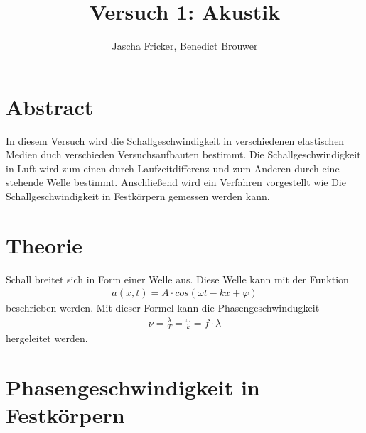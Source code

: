 \documentclass[11pt, a4paper]{article}
\title{Versuch 1: Akustik}
\author{Jascha Fricker, Benedict Brouwer}
\begin{document}
    \maketitle
    

    \section{Abstract}
    In diesem Versuch wird die Schallgeschwindigkeit in verschiedenen elastischen Medien
    duch verschieden Versuchsaufbauten bestimmt. Die Schallgeschwindigkeit in Luft wird zum einen durch
    Laufzeitdifferenz und zum Anderen durch eine stehende Welle bestimmt. Anschließend wird ein Verfahren 
    vorgestellt wie Die Schallgeschwindigkeit in Festkörpern gemessen werden kann.

    \tableofcontents

    \newpage
    
    \section{Theorie}
    Schall breitet sich in Form einer Welle aus. Diese Welle kann mit der Funktion
    \begin{align}
        a(x, t) = A \cdot cos(\omega t-kx+\varphi )
    \end{align}
    beschrieben werden. Mit dieser Formel kann die Phasengeschwindugkeit
    \begin{align}
        \nu = \frac{\lambda}{T} = \frac{\omega}{k} = f \cdot \lambda
    \end{align}
    hergeleitet werden. \\
    \section{Phasengeschwindigkeit in Festkörpern}
\end{document}
